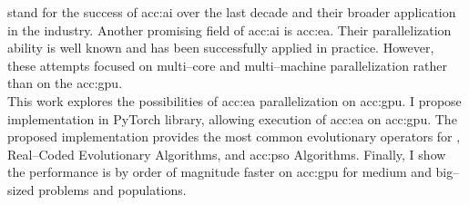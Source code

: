 \documentclass[12pt]{report}
\begin{document}
 stand for the success of \acrlong*{acc:ai} over the last decade and their broader application in the industry. Another promising field of \acrlong*{acc:ai} is \acrlong*{acc:ea}. Their parallelization ability is well known and has been successfully applied in practice. However, these attempts focused on multi--core and multi--machine parallelization rather than on the \acrshort*{acc:gpu}.\\
This work explores the possibilities of \acrlong*{acc:ea} parallelization on \acrshort*{acc:gpu}. I propose implementation in PyTorch library, allowing execution of \acrshort*{acc:ea} on \acrshort*{acc:gpu}. The proposed implementation provides the most common evolutionary operators for , Real--Coded Evolutionary Algorithms, and \acrlong*{acc:pso} Algorithms. Finally, I show the performance is by order of magnitude faster on \acrshort*{acc:gpu} for medium and big--sized problems and populations.
\end{document}
